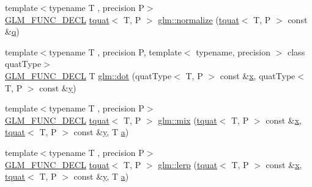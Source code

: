 \begin{DoxyCompactItemize}
\item 
{\footnotesize template$<$typename T , precision P$>$ }\\\mbox{\hyperlink{setup_8hpp_ab2d052de21a70539923e9bcbf6e83a51}{G\+L\+M\+\_\+\+F\+U\+N\+C\+\_\+\+D\+E\+CL}} \mbox{\hyperlink{structglm_1_1tquat}{tquat}}$<$ T, P $>$ \mbox{\hyperlink{group__gtc__quaternion_ga35b6bcb22ac6d1e4a85440f5b69bdf86}{glm\+::normalize}} (\mbox{\hyperlink{structglm_1_1tquat}{tquat}}$<$ T, P $>$ const \&\mbox{\hyperlink{glad_8h_a514729309336df22bcc8eda979d6ced4}{q}})
\item 
{\footnotesize template$<$typename T , precision P, template$<$ typename, precision $>$ class quat\+Type$>$ }\\\mbox{\hyperlink{setup_8hpp_ab2d052de21a70539923e9bcbf6e83a51}{G\+L\+M\+\_\+\+F\+U\+N\+C\+\_\+\+D\+E\+CL}} T \mbox{\hyperlink{group__gtc__quaternion_gac54dfc83de465a2d03e90d342242ab3d}{glm\+::dot}} (quat\+Type$<$ T, P $>$ const \&\mbox{\hyperlink{glad_8h_a92d0386e5c19fb81ea88c9f99644ab1d}{x}}, quat\+Type$<$ T, P $>$ const \&\mbox{\hyperlink{glad_8h_a66ddd433d2cacfe27f5906b7e86faeed}{y}})
\item 
{\footnotesize template$<$typename T , precision P$>$ }\\\mbox{\hyperlink{setup_8hpp_ab2d052de21a70539923e9bcbf6e83a51}{G\+L\+M\+\_\+\+F\+U\+N\+C\+\_\+\+D\+E\+CL}} \mbox{\hyperlink{structglm_1_1tquat}{tquat}}$<$ T, P $>$ \mbox{\hyperlink{group__gtc__quaternion_ga31cc82178742c36450f5662bd4fb30b0}{glm\+::mix}} (\mbox{\hyperlink{structglm_1_1tquat}{tquat}}$<$ T, P $>$ const \&\mbox{\hyperlink{glad_8h_a92d0386e5c19fb81ea88c9f99644ab1d}{x}}, \mbox{\hyperlink{structglm_1_1tquat}{tquat}}$<$ T, P $>$ const \&\mbox{\hyperlink{glad_8h_a66ddd433d2cacfe27f5906b7e86faeed}{y}}, T \mbox{\hyperlink{glad_8h_ac8729153468b5dcf13f971b21d84d4e5}{a}})
\item 
{\footnotesize template$<$typename T , precision P$>$ }\\\mbox{\hyperlink{setup_8hpp_ab2d052de21a70539923e9bcbf6e83a51}{G\+L\+M\+\_\+\+F\+U\+N\+C\+\_\+\+D\+E\+CL}} \mbox{\hyperlink{structglm_1_1tquat}{tquat}}$<$ T, P $>$ \mbox{\hyperlink{group__gtc__quaternion_ga5692804fa4db9e762a1c19b607e54435}{glm\+::lerp}} (\mbox{\hyperlink{structglm_1_1tquat}{tquat}}$<$ T, P $>$ const \&\mbox{\hyperlink{glad_8h_a92d0386e5c19fb81ea88c9f99644ab1d}{x}}, \mbox{\hyperlink{structglm_1_1tquat}{tquat}}$<$ T, P $>$ const \&\mbox{\hyperlink{glad_8h_a66ddd433d2cacfe27f5906b7e86faeed}{y}}, T \mbox{\hyperlink{glad_8h_ac8729153468b5dcf13f971b21d84d4e5}{a}})
\item 

\end{DoxyCompactItemize}
